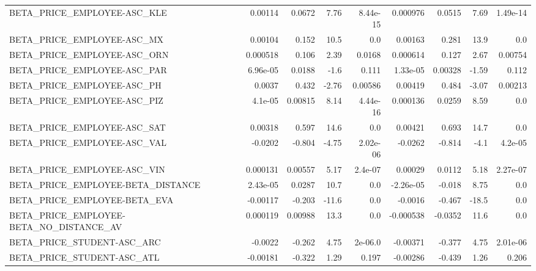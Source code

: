 \begin{tabular}{lrrrrrrrr}
BETA\_PRICE\_EMPLOYEE-ASC\_KLE             &     0.00114 &       0.0672 &    7.76 & 8.44e-15 &   0.000976 &      0.0515 &         7.69 &      1.49e-14 \\
BETA\_PRICE\_EMPLOYEE-ASC\_MX              &     0.00104 &        0.152 &    10.5 &      0.0 &    0.00163 &       0.281 &         13.9 &           0.0 \\
BETA\_PRICE\_EMPLOYEE-ASC\_ORN             &    0.000518 &        0.106 &    2.39 &   0.0168 &   0.000614 &       0.127 &         2.67 &       0.00754 \\
BETA\_PRICE\_EMPLOYEE-ASC\_PAR             &    6.96e-05 &       0.0188 &    -1.6 &    0.111 &   1.33e-05 &     0.00328 &        -1.59 &         0.112 \\
BETA\_PRICE\_EMPLOYEE-ASC\_PH              &      0.0037 &        0.432 &   -2.76 &  0.00586 &    0.00419 &       0.484 &        -3.07 &       0.00213 \\
BETA\_PRICE\_EMPLOYEE-ASC\_PIZ             &     4.1e-05 &      0.00815 &    8.14 & 4.44e-16 &   0.000136 &      0.0259 &         8.59 &           0.0 \\
BETA\_PRICE\_EMPLOYEE-ASC\_SAT             &     0.00318 &        0.597 &    14.6 &      0.0 &    0.00421 &       0.693 &         14.7 &           0.0 \\
BETA\_PRICE\_EMPLOYEE-ASC\_VAL             &     -0.0202 &       -0.804 &   -4.75 & 2.02e-06 &    -0.0262 &      -0.814 &         -4.1 &       4.2e-05 \\
BETA\_PRICE\_EMPLOYEE-ASC\_VIN             &    0.000131 &      0.00557 &    5.17 &  2.4e-07 &    0.00029 &      0.0112 &         5.18 &      2.27e-07 \\
BETA\_PRICE\_EMPLOYEE-BETA\_DISTANCE       &    2.43e-05 &       0.0287 &    10.7 &      0.0 &  -2.26e-05 &      -0.018 &         8.75 &           0.0 \\
BETA\_PRICE\_EMPLOYEE-BETA\_EVA            &    -0.00117 &       -0.203 &   -11.6 &      0.0 &    -0.0016 &      -0.467 &        -18.5 &           0.0 \\
BETA\_PRICE\_EMPLOYEE-BETA\_NO\_DISTANCE\_AV &    0.000119 &      0.00988 &    13.3 &      0.0 &  -0.000538 &     -0.0352 &         11.6 &           0.0 \\
BETA\_PRICE\_STUDENT-ASC\_ARC              &     -0.0022 &       -0.262 &    4.75 &  2e-06.0 &   -0.00371 &      -0.377 &         4.75 &      2.01e-06 \\
BETA\_PRICE\_STUDENT-ASC\_ATL              &    -0.00181 &       -0.322 &    1.29 &    0.197 &   -0.00286 &      -0.439 &         1.26 &         0.206 \\

\end{tabular}
